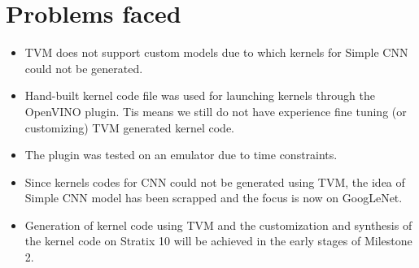 \documentclass[titlepage]{report}
\begin{document}
\chapter{Problems faced}
\begin{itemize}
    
\item TVM does not support custom models due to which kernels for Simple CNN could not be generated.

\item Hand-built kernel code file was used for launching kernels through the OpenVINO plugin. Tis means we still do not have experience fine tuning (or customizing) TVM generated kernel code.

\item The plugin was tested on an emulator due to time constraints. 

\item Since kernels codes for CNN could not be generated using TVM, the idea of Simple CNN model has been scrapped and the focus is now on GoogLeNet.

\item Generation of kernel code using TVM and the customization and synthesis of the kernel code on Stratix 10 will be achieved in the early stages of Milestone 2.

    

\end{itemize}
\end{document}
